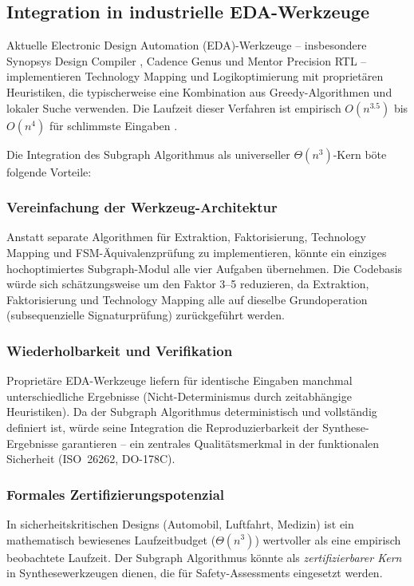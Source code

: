 ﻿\documentclass[a4paper,12pt]{article}
\theoremstyle{definition}
\begin{document}
\subsection{Integration in industrielle EDA-Werkzeuge}

Aktuelle Electronic Design Automation (EDA)-Werkzeuge -- insbesondere Synopsys Design
Compiler \cite{synopsys_dc}, Cadence Genus und Mentor Precision RTL -- implementieren
Technology Mapping und Logikoptimierung mit proprietären Heuristiken, die typischerweise
eine Kombination aus Greedy-Algorithmen und lokaler Suche verwenden. Die Laufzeit dieser
Verfahren ist empirisch $O(n^{3.5})$ bis $O(n^4)$ für schlimmste Eingaben
\cite{sentovich1992sis}.

Die Integration des Subgraph Algorithmus als universeller $\Theta(n^3)$-Kern böte
folgende Vorteile:

\subsubsection{Vereinfachung der Werkzeug-Architektur}

Anstatt separate Algorithmen für Extraktion, Faktorisierung, Technology Mapping und
FSM-Äquivalenzprüfung zu implementieren, könnte ein einziges hochoptimiertes
Subgraph-Modul alle vier Aufgaben übernehmen. Die Codebasis würde sich schätzungsweise
um den Faktor 3--5 reduzieren, da Extraktion, Faktorisierung und Technology Mapping
alle auf dieselbe Grundoperation (sub\-se\-quen\-zielle Signaturprüfung) zurückgeführt
werden.

\subsubsection{Wiederholbarkeit und Verifikation}

Proprietäre EDA-Werkzeuge liefern für identische Eingaben manchmal unterschiedliche
Ergebnisse (Nicht-Determinismus durch zeitabhängige Heuristiken). Da der Subgraph
Algorithmus deterministisch und vollständig definiert ist, würde seine Integration
die Reproduzierbarkeit der Synthese-Ergebnisse garantieren -- ein zentrales Qualitätsmerkmal
in der funktionalen Sicherheit (ISO~26262, DO-178C).

\subsubsection{Formales Zertifizierungspotenzial}

In sicherheitskritischen Designs (Automobil, Luftfahrt, Medizin) ist ein mathematisch
bewiesenes Laufzeitbudget ($\Theta(n^3)$) wertvoller als eine empirisch beobachtete
Laufzeit. Der Subgraph Algorithmus könnte als \emph{zertifizierbarer Kern} in
Synthesewerkzeugen dienen, die für Safety-Assessments eingesetzt werden.
\end{document}
